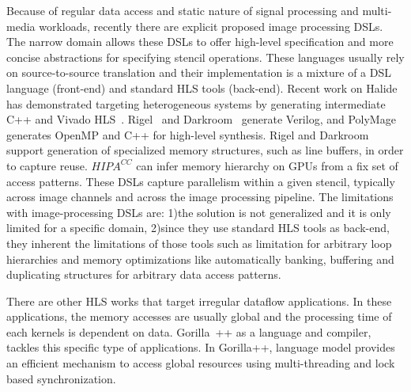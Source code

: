 Because of regular data access and static nature of signal processing and multi-media workloads, recently there are explicit proposed image processing DSLs.
The narrow domain allows these DSLs to offer high-level specification and more concise abstractions for specifying stencil operations.
These languages usually rely on source-to-source translation and their implementation is a mixture of a DSL language (front-end) and standard HLS tools (back-end).
Recent work on Halide~\cite{halide_pldi_2013} has demonstrated targeting heterogeneous systems by generating intermediate C++ and Vivado HLS~\cite{halide_fpga}.
Rigel~\cite{hegarty2016rigel} and Darkroom~\cite{darkroom} generate Verilog, and PolyMage~\cite{chugh_pact_2016} generates OpenMP and C++ for high-level synthesis.
Rigel and Darkroom support generation of specialized memory structures, such as line buffers, in order to capture reuse. $HIPA^{CC}$ can infer memory hierarchy on GPUs from a fix set of access patterns.
These DSLs capture parallelism within a given stencil, typically across image channels and across the image processing pipeline.
The limitations with image-processing DSLs are: 1)the solution is not generalized and it is only limited for a specific domain, 2)since they use standard HLS tools as back-end, they inherent the limitations of those tools such as limitation for arbitrary loop hierarchies and memory optimizations like automatically banking, buffering and duplicating structures for arbitrary data access patterns. 

There are other HLS works that target irregular dataflow applications.
In these applications, the memory accesses are usually global and the processing time of each kernels is dependent on data. 
Gorilla~\cite{lavasani_thesis}++ as a language and compiler, tackles this specific type of applications.
In Gorilla++, language model provides an efficient mechanism to access global resources using multi-threading and lock based synchronization.

